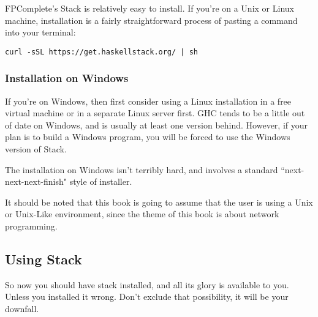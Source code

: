 FPComplete's Stack is relatively easy to install.  If you're on a Unix or Linux machine, installation is a fairly straightforward process of pasting a command into your terminal: 

\begin{verbatim}
curl -sSL https://get.haskellstack.org/ | sh
\end{verbatim}

\subsubsection{Installation on Windows}
If you're on Windows, then first consider using a Linux installation in a free virtual machine or in a separate Linux server first.  GHC tends to be a little out of date on Windows, and is usually at least one version behind. However, if your plan is to build a Windows program, you will be forced to use the Windows version of Stack. 

The installation on Windows isn't terribly hard, and involves a standard ``next-next-next-finish" style of installer. 

It should be noted that this book is going to assume that the user is using a Unix or Unix-Like environment, since the theme of this book is about network programming. 

\subsection{Using Stack}
So now you should have stack installed, and all its glory is available to you.  Unless you installed it wrong.  Don't exclude that possibility, it will be your downfall.  



